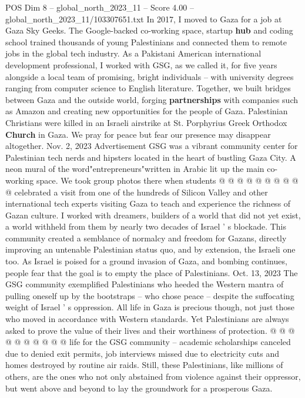 \begin{textsample}{POS Dim 8 – global\_north\_2023\_11 – Score 4.00 – global\_north\_2023\_11/103307651.txt}  \label{ex:f8_pos_185}
In 2017, I moved to Gaza for a job at Gaza Sky Geeks.
The Google-backed co-working space, startup \textbf{hub} and coding school trained thousands of young Palestinians and connected them to remote jobs in the global tech industry.
As a Pakistani American international development professional, I worked with GSG, as we called it, for five years alongside a local team of promising, bright individuals -- with university degrees ranging from computer science to English literature.
Together, we built bridges between Gaza and the outside world, forging \textbf{partnerships} with companies such as Amazon and creating new opportunities for the people of Gaza.
Palestinian Christians were killed in an Israeli airstrike at St.
Porphyrius Greek Orthodox \textbf{Church} in Gaza.
We pray for peace but fear our presence may disappear altogether.
Nov. 2, 2023 Advertisement GSG was a vibrant community center for Palestinian tech nerds and hipsters located in the heart of bustling Gaza City.
A neon mural of the word"entrepreneurs"written in Arabic lit up the main co-working space.
We took group photos there when students @ @ @ @ @ @ @ @ @ @ celebrated a visit from one of the hundreds of Silicon Valley and other international tech experts visiting Gaza to teach and experience the richness of Gazan culture.
I worked with dreamers, builders of a world that did not yet exist, a world withheld from them by nearly two decades of Israel ' s blockade.
This community created a semblance of normalcy and freedom for Gazans, directly improving an untenable Palestinian status quo, and by extension, the Israeli one too.
As Israel is poised for a ground invasion of Gaza, and bombing continues, people fear that the goal is to empty the place of Palestinians.
Oct. 13, 2023 The GSG community exemplified Palestinians who heeded the Western mantra of pulling oneself up by the bootstraps -- who chose peace -- despite the suffocating weight of Israel ' s oppression.
All life in Gaza is precious though, not just those who moved in accordance with Western standards.
Yet Palestinians are always asked to prove the value of their lives and their worthiness of protection. @ @ @ @ @ @ @ @ @ @ life for the GSG community -- academic scholarships canceled due to denied exit permits, job interviews missed due to electricity cuts and homes destroyed by routine air raids.
Still, these Palestinians, like millions of others, are the ones who not only abstained from violence against their oppressor, but went above and beyond to lay the groundwork for a prosperous Gaza.

\end{textsample}
